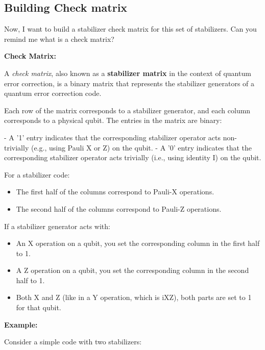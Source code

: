 \subsection{Building Check matrix}

\begin{ai}
Now, I want to build a stabilizer check matrix for this set of stabilizers. Can
you remind me what is a check matrix?
\end{ai}

\begin{airesult}
\textbf{Check Matrix:}

A \textit{check matrix}, also known as a \textbf{stabilizer matrix} in the context of quantum error correction, is a binary matrix that represents the stabilizer generators of a quantum error correction code.

Each row of the matrix corresponds to a stabilizer generator, and each column corresponds to a physical qubit. The entries in the matrix are binary:

- A '1' entry indicates that the corresponding stabilizer operator acts non-trivially (e.g., using Pauli X or Z) on the qubit.
- A '0' entry indicates that the corresponding stabilizer operator acts trivially (i.e., using identity I) on the qubit.

For a stabilizer code:

\begin{itemize}
  \item The first half of the columns correspond to Pauli-X operations.
  \item The second half of the columns correspond to Pauli-Z operations.
\end{itemize}

If a stabilizer generator acts with:

\begin{itemize}
  \item An X operation on a qubit, you set the corresponding column in the first half to 1.
  \item A Z operation on a qubit, you set the corresponding column in the second half to 1.
  \item Both X and Z (like in a Y operation, which is iXZ), both parts are set to 1 for that qubit.
\end{itemize}

\vsp

\textbf{Example:}

Consider a simple code with two stabilizers:


\end{airesult}
